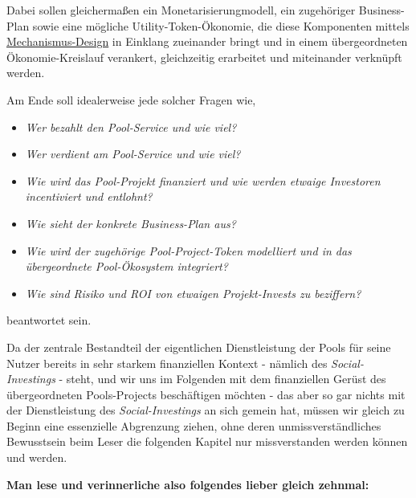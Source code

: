 

Dabei sollen gleichermaßen ein Monetarisierungmodell, ein zugehöriger Business-Plan sowie eine mögliche Utility-Token-Ökonomie, die diese Komponenten mittels \href{https://de.wikipedia.org/wiki/Mechanismus-Design-Theorie}{Mechanismus-Design} in Einklang zueinander bringt und in einem übergeordneten Ökonomie-Kreislauf verankert, gleichzeitig erarbeitet und miteinander verknüpft werden.

\vspace{0.2cm}

Am Ende soll idealerweise jede solcher Fragen wie,

\begin{itemize}
	\item \textit{Wer bezahlt den Pool-Service und wie viel?}
	\item \textit{Wer verdient am Pool-Service und wie viel?}
	\item \textit{Wie wird das Pool-Projekt finanziert und wie werden etwaige Investoren incentiviert und entlohnt?}
	\item \textit{Wie sieht der konkrete Business-Plan aus?}
	\item \textit{Wie wird der zugehörige Pool-Project-Token modelliert und in das übergeordnete Pool-Ökosystem integriert?}
	\item \textit{Wie sind Risiko und ROI von etwaigen Projekt-Invests zu beziffern?}
\end{itemize}

beantwortet sein.

\vspace{0.5cm}

Da der zentrale Bestandteil der eigentlichen Dienstleistung der Pools für seine Nutzer bereits in sehr starkem finanziellen Kontext - nämlich des \textit{Social-Investings} - steht, und wir uns im Folgenden mit dem finanziellen Gerüst des übergeordneten Pools-Projects beschäftigen möchten - das aber so gar nichts mit der Dienstleistung des \textit{Social-Investings} an sich gemein hat, müssen wir gleich zu Beginn eine essenzielle Abgrenzung ziehen, ohne deren unmissverständliches Bewusstsein beim Leser die folgenden Kapitel nur missverstanden werden können und werden.

\vspace{0.2cm}

\textbf{Man lese und verinnerliche also folgendes lieber gleich zehnmal:}

\vspace{0.2cm}

